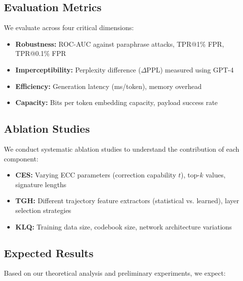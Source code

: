 \subsection{Evaluation Metrics}

We evaluate across four critical dimensions:

\begin{itemize}
\item \textbf{Robustness:} ROC-AUC against paraphrase attacks, TPR@1\% FPR, TPR@0.1\% FPR
\item \textbf{Imperceptibility:} Perplexity difference ($\Delta$PPL) measured using GPT-4
\item \textbf{Efficiency:} Generation latency (ms/token), memory overhead
\item \textbf{Capacity:} Bits per token embedding capacity, payload success rate
\end{itemize}

\subsection{Ablation Studies}

We conduct systematic ablation studies to understand the contribution of each component:

\begin{itemize}
\item \textbf{CES:} Varying ECC parameters (correction capability $t$), top-$k$ values, signature lengths
\item \textbf{TGH:} Different trajectory feature extractors (statistical vs. learned), layer selection strategies
\item \textbf{KLQ:} Training data size, codebook size, network architecture variations
\end{itemize}

\subsection{Expected Results}

Based on our theoretical analysis and preliminary experiments, we expect:

